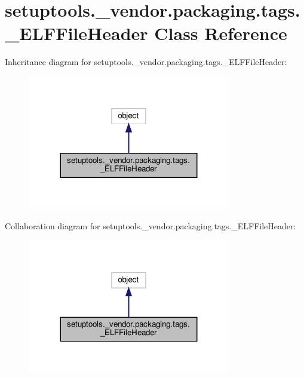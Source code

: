 \hypertarget{classsetuptools_1_1__vendor_1_1packaging_1_1tags_1_1__ELFFileHeader}{}\section{setuptools.\+\_\+vendor.\+packaging.\+tags.\+\_\+\+E\+L\+F\+File\+Header Class Reference}
\label{classsetuptools_1_1__vendor_1_1packaging_1_1tags_1_1__ELFFileHeader}


Inheritance diagram for setuptools.\+\_\+vendor.\+packaging.\+tags.\+\_\+\+E\+L\+F\+File\+Header\+:
\nopagebreak
\begin{figure}[H]
\begin{center}
\leavevmode
\includegraphics[width=251pt]{classsetuptools_1_1__vendor_1_1packaging_1_1tags_1_1__ELFFileHeader__inherit__graph}
\end{center}
\end{figure}


Collaboration diagram for setuptools.\+\_\+vendor.\+packaging.\+tags.\+\_\+\+E\+L\+F\+File\+Header\+:
\nopagebreak
\begin{figure}[H]
\begin{center}
\leavevmode
\includegraphics[width=251pt]{classsetuptools_1_1__vendor_1_1packaging_1_1tags_1_1__ELFFileHeader__coll__graph}
\end{center}
\end{figure}
